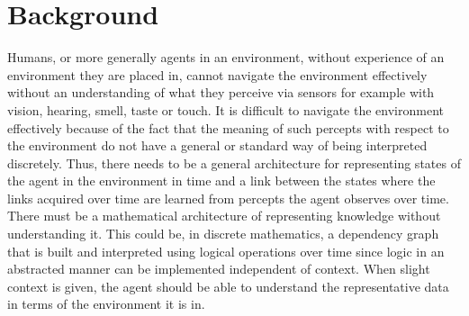 \section{Background}



Humans, or more generally agents in an environment, without experience of an environment they are placed in, cannot navigate the environment effectively without an understanding of what they perceive via sensors for example with vision, hearing, smell, taste or touch.
It is difficult to navigate the environment effectively because of the fact that the meaning of such percepts with respect to the environment do not have a general or standard way of being interpreted discretely. 
Thus, there needs to be a general architecture for representing states of the agent in the environment in time and a link between the states where the links acquired over time are learned from percepts the agent observes over time. 
There must be a mathematical architecture of representing knowledge without understanding it. This could be, in discrete mathematics, a dependency graph that is built and interpreted using logical operations over time since logic in an abstracted manner can be implemented independent of context. When slight context is given, the agent should be able to understand the representative data in terms of the environment it is in.


